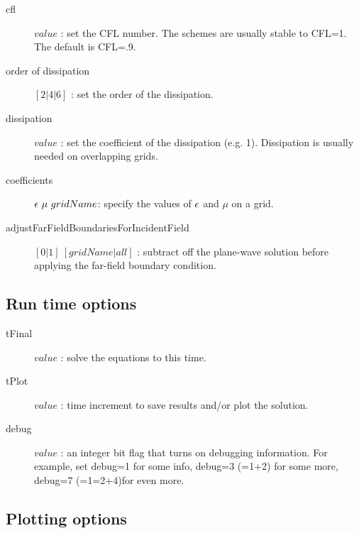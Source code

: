 \documentclass{article}
\begin{document}
\begin{description}
  \item [\qquad cfl] $value$ : set the CFL number. The schemes are usually stable to CFL=1. The default is CFL=.9.
  \item [\qquad order of dissipation] $[2|4|6]$ : set the order of the dissipation.
  \item [\qquad dissipation] $value$ : set the coefficient of the dissipation (e.g. 1). Dissipation is usually needed on overlapping grids. 
  \item [\qquad coefficients] $\epsilon~\mu~gridName$: specify the values of $\epsilon$ and $\mu$ on a grid.
  \item [\qquad adjustFarFieldBoundariesForIncidentField] $[0|1]~[gridName|all]$ : subtract off the plane-wave solution before applying the
         far-field boundary condition.
\end{description}


\subsection{Run time options}

\begin{description}
  \item [\qquad tFinal] $value$ : solve the equations to this time.
  \item [\qquad tPlot] $value$ : time increment to save results and/or plot the solution.
  \item [\qquad debug] $value$ : an integer bit flag that turns on debugging information. For example, set debug=1 for some info, debug=3 (=1+2) for some
    more, debug=7 (=1=2+4)for even more. 
\end{description}

\subsection{Plotting options}
\end{document}
